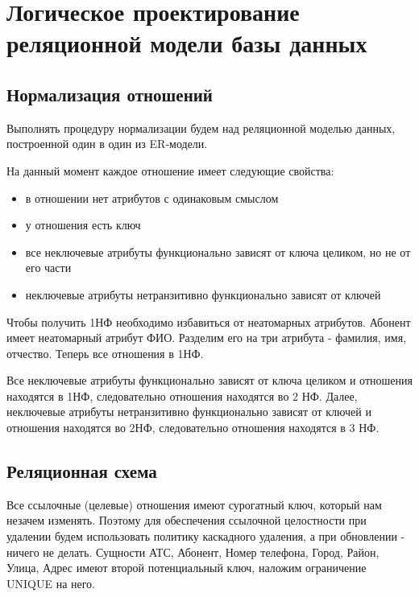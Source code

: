 \documentclass{report}
\begin{document}
\chapter{Логическое проектирование реляционной модели базы данных}

\section{Нормализация отношений}

Выполнять процедуру нормализации будем над реляционной моделью 
данных, построенной один в один из ER-модели. 

На данный момент 
каждое отношение имеет следующие свойства:
\begin{itemize}
    \item в отношении нет атрибутов с одинаковым смыслом
    \item у отношения есть ключ
    \item все неключевые атрибуты функционально зависят от ключа целиком, но не от его части
    \item неключевые атрибуты нетранзитивно функционально зависят от ключей
\end{itemize} 
Чтобы получить 1НФ необходимо избавиться от неатомарных атрибутов. 
Абонент имеет неатомарный атрибут ФИО. Разделим его на три атрибута - 
фамилия, имя, отчество. Теперь все отношения в 1НФ.

Все неключевые атрибуты функционально зависят от ключа целиком и отношения
находятся в 1НФ, следовательно отношения находятся во 2 НФ. Далее, неключевые 
атрибуты нетранзитивно функционально зависят от ключей и отношения находятся
во 2НФ, следовательно отношения находятся в 3 НФ.

\section{Реляционная схема}

Все ссылочные (целевые) отношения имеют сурогатный ключ, который
нам незачем изменять. Поэтому для обеспечения ссылочной целостности
при удалении будем использовать политику каскадного удаления, 
а при обновлении - ничего не делать. Сущности АТС, Абонент, Номер телефона,
Город, Район, Улица, Адрес имеют второй потенциальный ключ,
наложим ограничение UNIQUE на него.
\end{document}
